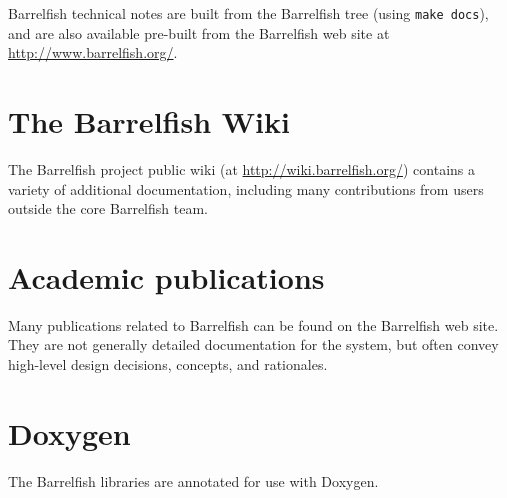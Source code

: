 \documentclass[a4paper,twoside]{report} %
\begin{document}
Barrelfish technical notes are built from the Barrelfish tree (using
\texttt{make docs}), and are also available pre-built from the
Barrelfish web site at \url{http://www.barrelfish.org/}.

\section{The Barrelfish Wiki}

The Barrelfish project public wiki (at
\url{http://wiki.barrelfish.org/}) contains a variety of additional
documentation, including many contributions from users outside the
core Barrelfish team.

\section{Academic publications}

Many publications related to Barrelfish can be found on the Barrelfish
web site.  They are not generally detailed documentation for the
system, but often convey high-level design decisions, concepts, and
rationales.

\section{Doxygen}

The Barrelfish libraries are annotated for use with Doxygen. 



\end{document}
